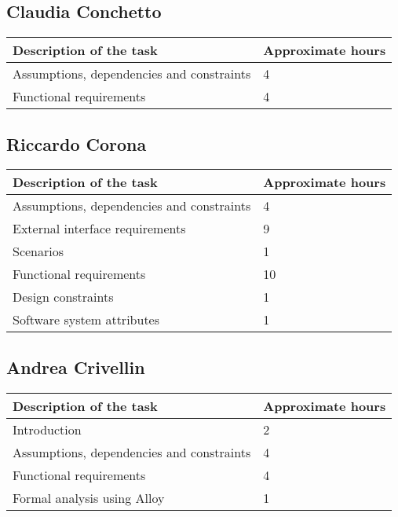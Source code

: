 
%

\subsection{Claudia Conchetto}
\begin{table}[h!]
\begin{tabular}{|l|l|}
\hline
\textbf{Description of the task} & \textbf{Approximate hours} \\ \hline
Assumptions, dependencies and constraints & 4 \\ \hline
Functional requirements & 4 \\ \hline
\end{tabular}
\end{table}

\subsection{Riccardo Corona}
\begin{table}[h!]
\begin{tabular}{|l|l|}
\hline
\textbf{Description of the task} & \textbf{Approximate hours} \\ \hline
Assumptions, dependencies and constraints & 4 \\ \hline
External interface requirements & 9 \\ \hline
Scenarios & 1 \\ \hline
Functional requirements & 10 \\ \hline
Design constraints & 1 \\ \hline
Software system attributes & 1 \\ \hline
\end{tabular}
\end{table}

\subsection{Andrea Crivellin}
\begin{table}[h!]
\begin{tabular}{|l|l|}
\hline
\textbf{Description of the task} & \textbf{Approximate hours} \\ \hline
Introduction & 2 \\ \hline
Assumptions, dependencies and constraints & 4 \\ \hline
Functional requirements & 4 \\ \hline
Formal analysis using Alloy & 1 \\ \hline
\end{tabular}
\end{table}

%